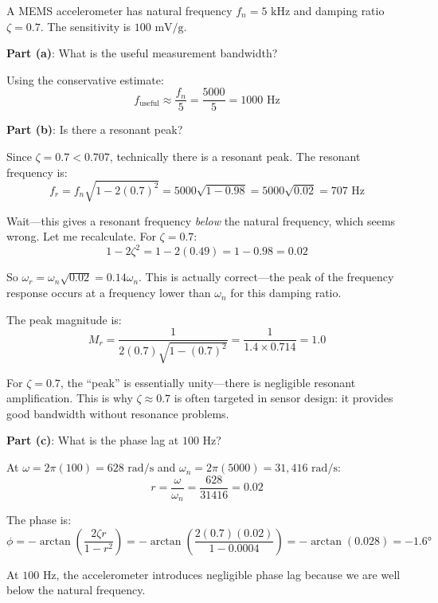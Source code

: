 \begin{example}
\label{ex:accelerometer_freq}

A MEMS accelerometer has natural frequency $f_n = 5\text{ kHz}$ and damping ratio $\zeta = 0.7$. The sensitivity is $100\text{ mV/g}$.

\textbf{Part (a)}: What is the useful measurement bandwidth?

Using the conservative estimate:
\begin{equation}
f_{\text{useful}} \approx \frac{f_n}{5} = \frac{5000}{5} = 1000\text{ Hz}
\end{equation}

\textbf{Part (b)}: Is there a resonant peak?

Since $\zeta = 0.7 < 0.707$, technically there is a resonant peak. The resonant frequency is:
\begin{equation}
f_r = f_n\sqrt{1 - 2(0.7)^2} = 5000\sqrt{1 - 0.98} = 5000\sqrt{0.02} = 707\text{ Hz}
\end{equation}

Wait---this gives a resonant frequency \textit{below} the natural frequency, which seems wrong. Let me recalculate. For $\zeta = 0.7$:
\begin{equation}
1 - 2\zeta^2 = 1 - 2(0.49) = 1 - 0.98 = 0.02
\end{equation}

So $\omega_r = \omega_n\sqrt{0.02} = 0.14\omega_n$. This is actually correct---the peak of the frequency response occurs at a frequency lower than $\omega_n$ for this damping ratio.

The peak magnitude is:
\begin{equation}
M_r = \frac{1}{2(0.7)\sqrt{1-(0.7)^2}} = \frac{1}{1.4 \times 0.714} = 1.0
\end{equation}

For $\zeta = 0.7$, the ``peak'' is essentially unity---there is negligible resonant amplification. This is why $\zeta \approx 0.7$ is often targeted in sensor design: it provides good bandwidth without resonance problems.

\textbf{Part (c)}: What is the phase lag at $100\text{ Hz}$?

At $\omega = 2\pi(100) = 628\text{ rad/s}$ and $\omega_n = 2\pi(5000) = 31{,}416\text{ rad/s}$:
\begin{equation}
r = \frac{\omega}{\omega_n} = \frac{628}{31416} = 0.02
\end{equation}

The phase is:
\begin{equation}
\phi = -\arctan\left(\frac{2\zeta r}{1 - r^2}\right) = -\arctan\left(\frac{2(0.7)(0.02)}{1 - 0.0004}\right) = -\arctan(0.028) = -1.6°
\end{equation}

At $100\text{ Hz}$, the accelerometer introduces negligible phase lag because we are well below the natural frequency.
\end{example}

